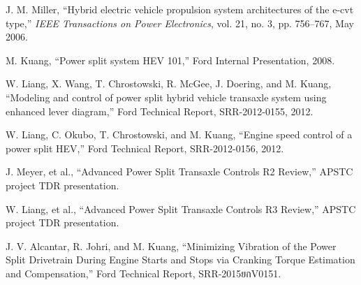 \documentclass[11pt,letterpaper]{report}
\begin{document}
\begin{thebibliography}{199}



 J. M. Miller, ``Hybrid electric vehicle propulsion system
  architectures of the e-cvt type,'' {\it IEEE Transactions on Power
    Electronics}, vol. 21, no. 3, pp. 756--767, May 2006.

 M. Kuang, ``Power split system HEV 101,'' Ford
  Internal Presentation, 2008.


 W. Liang, X. Wang, T.
  Chrostowski, R. McGee, J. Doering, and M. Kuang, ``Modeling and control of power
  split hybrid vehicle transaxle system using enhanced lever diagram,''
  Ford Technical Report, SRR-2012-0155, 2012.

 W. Liang, C. Okubo, T. Chrostowski, and
  M. Kuang, ``Engine speed control of a power split HEV,'' Ford
  Technical Report, SRR-2012-0156, 2012.

 J. Meyer, et al., ``Advanced Power
  Split Transaxle Controls R2 Review,'' APSTC project TDR presentation. 


 W. Liang, et al., ``Advanced Power
  Split Transaxle Controls R3 Review,'' APSTC project TDR presentation. 

 J. V. Alcantar, R. Johri, and M. Kuang,
  ``Minimizing Vibration of the Power Split Drivetrain During Engine
  Starts and Stops via Cranking Torque Estimation and Compensation,''
  Ford Technical Report, SRR-2015ยกV0151.


\end{thebibliography}
\end{document}
